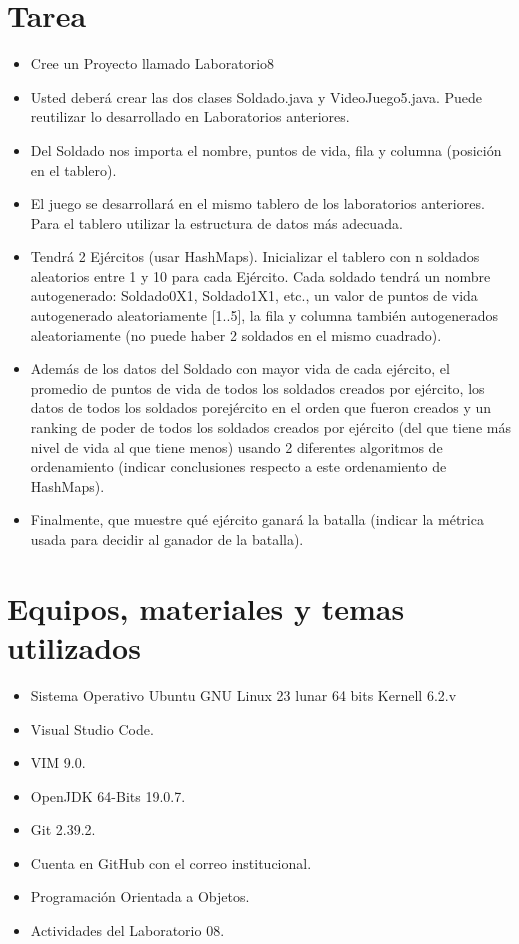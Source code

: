 \documentclass{article}
\begin{document}
	\section{Tarea}
	\begin{itemize}		
        \item Cree un Proyecto llamado Laboratorio8
		\item Usted deberá crear las dos clases Soldado.java y VideoJuego5.java. Puede reutilizar lo desarrollado en Laboratorios anteriores.
		\item Del Soldado nos importa el nombre, puntos de vida, fila y columna (posición en el tablero).
		\item El juego se desarrollará en el mismo tablero de los laboratorios anteriores. Para el tablero utilizar la estructura de datos más adecuada.
		\item Tendrá 2 Ejércitos (usar HashMaps). Inicializar el tablero con n soldados aleatorios entre 1 y 10 para cada Ejército. Cada soldado tendrá un nombre autogenerado: Soldado0X1, Soldado1X1, etc., un valor de puntos de vida autogenerado aleatoriamente [1..5], la fila y columna también autogenerados aleatoriamente (no puede haber 2 soldados en el mismo cuadrado). 
		\item Además de los datos del Soldado con mayor vida de cada ejército, el promedio de puntos de vida de todos los soldados creados por ejército, los datos de todos los soldados porejército en el orden que fueron creados y un ranking de poder de todos los soldados creados por ejército (del que tiene más nivel de vida al que tiene menos) usando 2 diferentes algoritmos de ordenamiento (indicar conclusiones respecto a este ordenamiento de HashMaps).
		\item Finalmente, que muestre qué ejército ganará la batalla (indicar la métrica usada para decidir al ganador de la batalla).
	\end{itemize}

	\section{Equipos, materiales y temas utilizados}
	\begin{itemize}
		\item Sistema Operativo Ubuntu GNU Linux 23 lunar 64 bits Kernell 6.2.v
		\item Visual Studio Code.
		\item VIM 9.0.
		\item OpenJDK 64-Bits 19.0.7.
		\item Git 2.39.2.
		\item Cuenta en GitHub con el correo institucional.
		\item Programación Orientada a Objetos.
		\item Actividades del Laboratorio 08.	
	\end{itemize}
	
\end{document}
